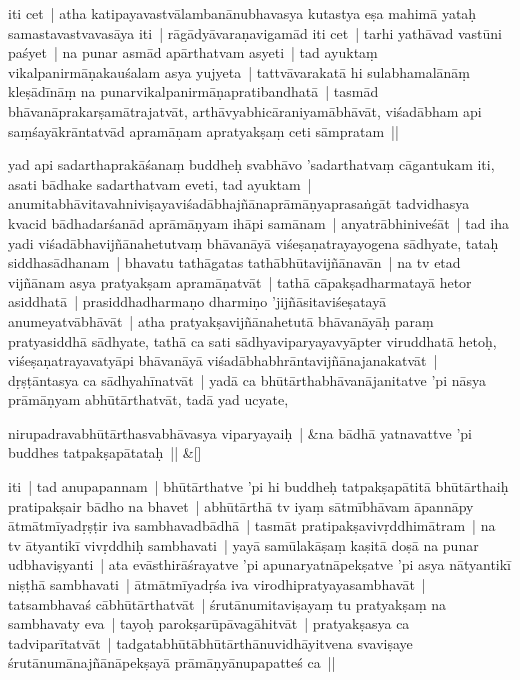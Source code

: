 \documentclass[article,12pt,a4paper]{memoir}%
\newcounter{parCount}
\begin{document}
	  
	  

	  
	  \pstart \leavevmode%
	iti cet | atha katipayavastvālambanānubhavasya kutastya eṣa mahimā yataḥ samastavastvavasāya iti | rāgādyāvaraṇavigamād iti cet | tarhi yathāvad vastūni paśyet | na punar asmād apārthatvam asyeti | tad ayuktaṃ vikalpanirmāṇakauśalam asya yujyeta | tattvāvarakatā hi sulabhamalānāṃ kleṣādīnāṃ na punarvikalpanirmāṇapratibandhatā | tasmād bhāvanāprakarṣamātrajatvāt, arthāvyabhicāraniyamābhāvāt, viśadābham api saṃśayākrāntatvād apramāṇam apratyakṣaṃ ceti sāmpratam || 
	{}
	\pend%
      

	  
	  \pstart \leavevmode%
	\label{thakur75-13.1}yad api sadarthaprakāśanaṃ buddheḥ svabhāvo 'sadarthatvaṃ cāgantukam iti, asati bādhake sadarthatvam eveti, tad ayuktam | anumitabhāvitavahniviṣayaviśadābhajñānaprāmāṇyaprasaṅgāt tadvidhasya kvacid bādhadarśanād aprāmāṇyam ihāpi samānam | anyatrābhiniveśāt | tad iha yadi viśadābhavijñānahetutvaṃ bhāvanāyā viśeṣaṇatrayayogena sādhyate, tataḥ siddhasādhanam | bhavatu tathāgatas tathābhūtavijñānavān | na tv etad vijñānam asya pratyakṣam apramāṇatvāt | tathā cāpakṣadharmatayā hetor asiddhatā | prasiddhadharmaṇo dharmiṇo 'jijñāsitaviśeṣatayā anumeyatvābhāvāt | atha pratyakṣavijñānahetutā bhāvanāyāḥ paraṃ pratyasiddhā sādhyate, tathā ca sati sādhyaviparyayavyāpter viruddhatā hetoḥ, viśeṣaṇatrayavatyāpi bhāvanāyā viśadābhabhrāntavijñānajanakatvāt | dṛṣṭāntasya ca sādhyahīnatvāt | yadā ca bhūtārthabhāvanājanitatve 'pi nāsya prāmāṇyam abhūtārthatvāt, tadā yad ucyate, 
	{}
	\pend%
      
	    
	    \stanza[\smallbreak]
	  nirupadravabhūtārthasvabhāvasya viparyayaiḥ | &na bādhā yatnavattve 'pi buddhes tatpakṣapātataḥ || \&[\smallbreak]
	  
	  
	  

	  
	  \pstart \leavevmode%
	iti | tad anupapannam | bhūtārthatve 'pi hi buddheḥ tatpakṣapātitā bhūtārthaiḥ pratipakṣair bādho na bhavet | abhūtārthā tv iyaṃ sātmībhāvam āpannāpy ātmātmīyadṛṣṭir iva sambhavadbādhā | tasmāt pratipakṣavivṛddhimātram | na tv ātyantikī vivṛddhiḥ sambhavati | yayā samūlakāṣaṃ kaṣitā doṣā na punar udbhaviṣyanti | ata evāsthirāśrayatve 'pi apunaryatnāpekṣatve 'pi asya nātyantikī niṣṭhā sambhavati | ātmātmīyadṛśa iva virodhipratyayasambhavāt | tatsambhavaś cābhūtārthatvāt | śrutānumitaviṣayaṃ tu pratyakṣaṃ na sambhavaty eva | tayoḥ parokṣarūpāvagāhitvāt | pratyakṣasya ca tadviparītatvāt | tadgatabhūtābhūtārthānuvidhāyitvena svaviṣaye śrutānumānajñānāpekṣayā prāmāṇyānupapatteś ca || 
	{}
	\pend%
      
\end{document}
